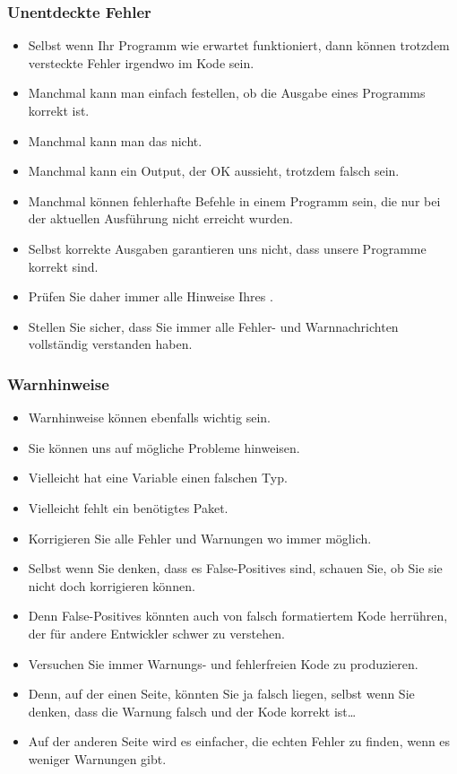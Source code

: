 \documentclass[aspectratio=169,mathserif,notheorems]{beamer}%
\begin{document}
\begin{frame}%
\frametitle{Unentdeckte Fehler}%
\begin{itemize}%
\item Selbst wenn Ihr Programm wie erwartet funktioniert, dann können trotzdem versteckte Fehler irgendwo im Kode sein.%
%
\item<2-> Manchmal kann man einfach festellen, ob die Ausgabe eines Programms korrekt ist.%
%
\item<3-> Manchmal kann man das nicht.%
%
\item<4-> Manchmal kann ein Output, der OK aussieht, trotzdem falsch sein.%
%
\item<5-> Manchmal können fehlerhafte Befehle in einem Programm sein, die nur bei der aktuellen Ausführung nicht erreicht wurden.%
%
\item<6-> Selbst korrekte Ausgaben garantieren uns nicht, dass unsere Programme korrekt sind.%
%
\item<7-> Prüfen Sie daher immer alle Hinweise Ihres .%
%
\item<8-> Stellen Sie sicher, dass Sie immer alle Fehler- und Warnnachrichten vollständig verstanden haben.%
%
\end{itemize}%
\end{frame}%
%
\begin{frame}%
\frametitle{Warnhinweise}%
%
\begin{itemize}%
\item Warnhinweise können ebenfalls wichtig sein.%
\item<2-> Sie können uns auf mögliche Probleme hinweisen.%
\item<3-> Vielleicht hat eine Variable einen falschen Typ.%
\item<4-> Vielleicht fehlt ein benötigtes Paket.%
\item<5-> Korrigieren Sie alle Fehler und Warnungen wo immer möglich.%
\item<6-> Selbst wenn Sie denken, dass es False-Positives sind, schauen Sie, ob Sie sie nicht doch korrigieren können.%
\item<7-> Denn False-Positives könnten auch von falsch formatiertem Kode herrühren, der für andere Entwickler schwer zu verstehen.%
\item<8-> Versuchen Sie immer Warnungs- und fehlerfreien Kode zu produzieren.%
\item<9-> Denn, auf der einen Seite, könnten Sie ja falsch liegen, selbst wenn Sie denken, dass die Warnung falsch und der Kode korrekt ist\dots%
\item<10-> Auf der anderen Seite wird es einfacher, die echten Fehler zu finden, wenn es weniger Warnungen gibt.%
\end{itemize}%
\end{frame}%
\end{document}
